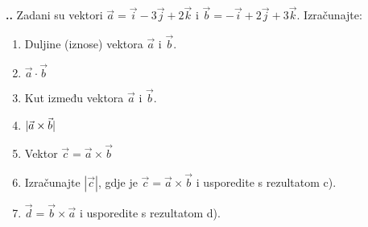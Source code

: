 
\noindent 
\textbf{
\thecjelina.\thezadatak.}
Zadani su vektori $\vec{a}=\vec{i}-3\vec{j}+2\vec{k} $ 
i $\vec{b}= -\vec{i}+ 2\vec{j}+3\vec{k}  $. Izračunajte:
\begin{enumerate}[label=\alph*)]
 \item Duljine (iznose) vektora $\vec{a}$ i $\vec{b}$.
 \item $\vec{a} \cdot \vec{b}  $
 \item Kut između vektora $\vec{a}$ i $\vec{b}$.
 \item $\arrowvert \vec{a} \times \vec{b}  \arrowvert$ 
 \item Vektor $\vec{c}= \vec{a} \times \vec{b}  $ 
 \item Izračunajte $ | \vec{c} |$, gdje je $\vec{c}=\vec{a} \times \vec{b}$ i usporedite s rezultatom c).
 \item $\vec{d}=\vec{b}\times\vec{a}$ i usporedite s rezultatom d).
\end{enumerate}
